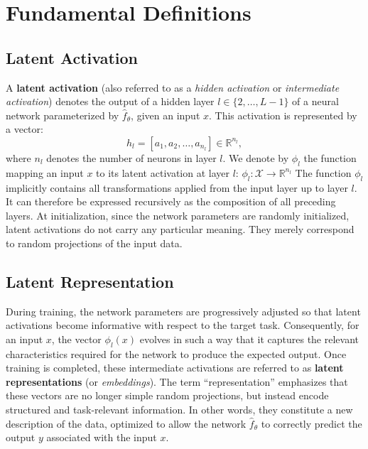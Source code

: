 \section{Fundamental Definitions}

\subsection{Latent Activation}
A \textbf{latent activation} (also referred to as a \textit{hidden activation} or \textit{intermediate activation}) denotes the output of a hidden layer \( l \in \{2, \dots, L-1\} \) of a neural network parameterized by \( \hat{f}_{\theta} \), given an input \( x \).
This activation is represented by a vector:
\[
h_l = [a_1, a_2, \dots, a_{n_l}] \in \mathbb{R}^{n_l},
\]
where \( n_l \) denotes the number of neurons in layer \( l \).
We denote by \( \phi_l \) the function mapping an input \( x \) to its latent activation at layer \( l \):
\(
\phi_l : \mathcal{X} \rightarrow \mathbb{R}^{n_l}
\)
The function \( \phi_l \) implicitly contains all transformations applied from the input layer up to layer \( l \).
It can therefore be expressed recursively as the composition of all preceding layers.
At initialization, since the network parameters are randomly initialized, latent activations do not carry any particular meaning.
They merely correspond to random projections of the input data.

\subsection{Latent Representation}
During training, the network parameters are progressively adjusted so that latent activations become informative with respect to the target task.
Consequently, for an input \( x \), the vector \( \phi_l(x) \) evolves in such a way that it captures the relevant characteristics required for the network to produce the expected output.
Once training is completed, these intermediate activations are referred to as \textbf{latent representations} (or \textit{embeddings}).
The term ``representation'' emphasizes that these vectors are no longer simple random projections, but instead encode structured and task-relevant information.
In other words, they constitute a new description of the data, optimized to allow the network \( \hat{f}_{\theta} \) to correctly predict the output \( y \) associated with the input \( x \).

